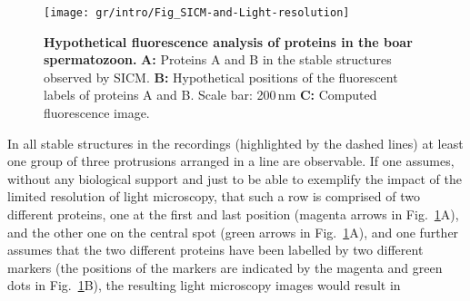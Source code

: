 \begin{figure}
  \sidecaption
  \texttt{[image: gr/intro/Fig\_SICM-and-Light-resolution]}%
  \caption{\textbf{Hypothetical fluorescence analysis of proteins in the boar
      spermatozoon.} \textbf{A:} Proteins A and B in the stable structures
    observed by SICM. \textbf{B:} Hypothetical positions of the fluorescent
    labels of proteins A and B. Scale bar: 200\,nm \textbf{C:} Computed
    fluorescence image.}
  \label{fig:sicm-and-light-resolution}
\end{figure}
In all stable structures in the recordings (highlighted by
the dashed lines) at least one group of three protrusions arranged in a line
are observable. If one assumes, without any biological support and just to be
able to exemplify the impact of the limited resolution of light microscopy,
that such a row is comprised of two different proteins, one at the first and
last position (magenta arrows in Fig.~\ref{fig:sicm-and-light-resolution}A),
and the other one on the central spot (green arrows in Fig.~\ref{fig:sicm-and-light-resolution}A), and one further assumes
that the two different proteins have been labelled by two different markers
(the positions of the markers are indicated by the magenta and green dots in Fig.~\ref{fig:sicm-and-light-resolution}B),
the resulting light microscopy images would result in      





